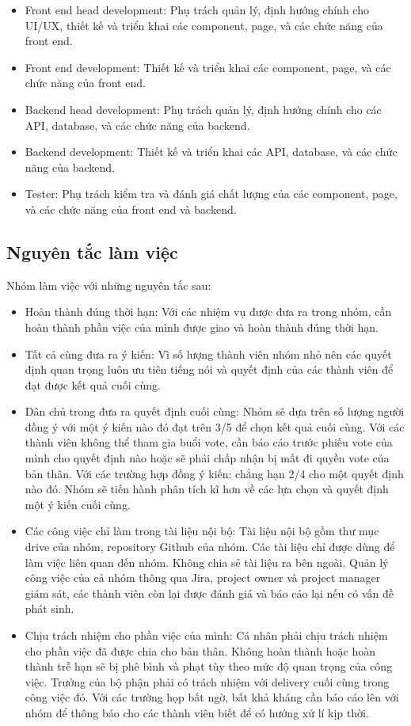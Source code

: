 \documentclass[12pt,a4paper]{article}
\begin{document}
\begin{itemize}
  \item Front end head development: Phụ trách quản lý, định hướng chính cho UI/UX, thiết kế và triển khai các component, page, và các chức năng của front end.
  \item Front end development: Thiết kế và triển khai các component, page, và các chức năng của front end.
  \item Backend head development: Phụ trách quản lý, định hướng chính cho các API, database, và các chức năng của backend.
  \item Backend development: Thiết kế và triển khai các API, database, và các chức năng của backend.
  \item Tester: Phụ trách kiểm tra và đánh giá chất lượng của các component, page, và các chức năng của front end và backend.
\end{itemize}

\subsection{Nguyên tắc làm việc}
Nhóm làm việc với những nguyên tắc sau:
\begin{itemize}
    \item Hoàn thành đúng thời hạn: Với các nhiệm vụ được đưa ra trong nhóm, cần hoàn thành phần việc của mình được giao và hoàn thành đúng thời hạn.
    \item Tất cả cùng đưa ra ý kiến: Vì số lượng thành viên nhóm nhỏ nên các quyết định quan trọng luôn ưu tiên tiếng nói và quyết định của các thành viên để đạt được kết quả cuối cùng.
    \item Dân chủ trong đưa ra quyết định cuối cùng: Nhóm sẽ dựa trên số lượng người đồng ý với một ý kiến nào đó đạt trên 3/5 để chọn kết quả cuối cùng. Với các thành viên không thể tham gia buổi vote, cần báo cáo trước phiếu vote của mình cho quyết định nào hoặc sẽ phải chấp nhận bị mất đi quyền vote của bản thân. Với các trường hợp đồng ý kiến: chẳng hạn 2/4 cho một quyết định nào đó. Nhóm sẽ tiến hành phân tích kĩ hơn về các lựa chọn và quyết định một ý kiến cuối cùng.
    \item Các công việc chỉ làm trong tài liệu nội bộ: Tài liệu nội bộ gồm thư mục drive của nhóm, repository Github của nhóm. Các tài liệu chỉ được dùng để làm việc liên quan đến nhóm. Không chia sẻ tài liệu ra bên ngoài. Quản lý công việc của cả nhóm thông qua Jira, project owner và project manager giám sát, các thành viên còn lại được đánh giá và báo cáo lại nếu có vấn đề phát sinh.
    \item Chịu trách nhiệm cho phần việc của mình: Cá nhân phải chịu trách nhiệm cho phần việc đã được chia cho bản thân. Không hoàn thành hoặc hoàn thành trễ hạn sẽ bị phê bình và phạt tùy theo mức độ quan trọng của công việc. Trưởng của bộ phận phải có trách nhiệm với delivery cuối cùng trong công việc đó. Với các trường họp bất ngờ, bất khả kháng cần báo cáo lên với nhóm để thông báo cho các thành viên biết để có hướng xử lí kịp thời.
\end{itemize}
\end{document}
